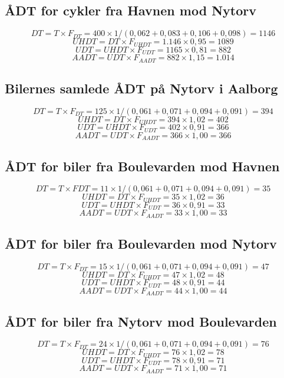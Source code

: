 \subsection{ÅDT for cykler fra Havnen mod Nytorv}
\label{sub:cykelaadtnytorve}

  $$DT = T \times F_{DT} = 400 \times 1/(0,062 + 0,083 + 0,106 + 0,098) = 1146$$
  $$UHDT = DT \times F_{UHDT} = 1.146 \times 0,95 = 1089$$
  $$UDT = UHDT \times F_{UDT} = 1165 \times 0,81 = 882$$
  $$AADT = UDT \times F_{AADT} = 882 \times 1,15 = 1.014$$

\subsection{Bilernes samlede ÅDT på Nytorv i Aalborg}
\label{sub:cykelaadtnytorvf}

  $$DT = T \times F_{DT} = 125 \times 1/(0,061+0,071+0,094+0,091) = 394$$
  $$UHDT = DT \times F_{UHDT} = 394 \times 1,02 = 402$$
  $$UDT = UHDT \times F_{UDT} = 402 \times 0,91 = 366$$
  $$AADT = UDT \times F_{AADT} = 366 \times 1,00 = 366$$

\subsection{ ÅDT for biler fra Boulevarden mod Havnen}
\label{sub:cykelaadtnytorvg}

  $$DT = T \times FDT = 11 \times 1/(0,061 + 0,071 + 0,094 + 0,091) = 35$$
  $$UHDT = DT \times F_{UHDT} = 35 \times 1,02 = 36$$
  $$UDT = UHDT \times F_{UDT} = 36 \times 0,91 = 33$$
  $$AADT = UDT \times F_{AADT} = 33 \times 1,00 = 33$$

\subsection{ ÅDT for biler fra Boulevarden mod Nytorv}
\label{sub:cykelaadtnytorvh}

  $$DT = T \times F_{DT} = 15 \times 1/(0,061 + 0,071 + 0,094 + 0,091) = 47$$
  $$UHDT = DT \times F_{UHDT} = 47 \times 1,02 = 48$$
  $$UDT = UHDT \times F_{UDT} = 48 \times 0,91 = 44$$
  $$AADT = UDT \times F_{AADT} = 44 \times 1,00 = 44$$

\subsection{ ÅDT for biler fra Nytorv mod Boulevarden}
\label{sub:cykelaadtnytorvi}

  $$DT = T \times F_{DT} = 24 \times 1/(0,061 + 0,071 + 0,094 + 0,091) = 76$$
  $$UHDT = DT \times F_{UHDT} = 76 \times 1,02 = 78$$
  $$UDT = UHDT \times F_{UDT} = 78 \times 0,91 = 71$$
  $$AADT = UDT \times F_{AADT} = 71 \times 1,00 = 71$$

